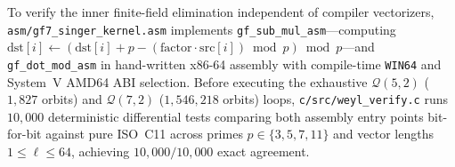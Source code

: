 \documentclass[11pt,letterpaper]{article}
\theoremstyle{plain}
\theoremstyle{definition}
\theoremstyle{remark}
\newcommand{\Qcode}{\mathcal{Q}}
\begin{document}
To verify the inner finite-field elimination independent of compiler vectorizers, \texttt{asm/\allowbreak gf7\_\allowbreak singer\_\allowbreak kernel.asm} implements \texttt{gf\_\allowbreak sub\_\allowbreak mul\_\allowbreak asm}---computing $\mathrm{dst}[i]\gets (\mathrm{dst}[i]+p-(\mathrm{factor}\cdot\mathrm{src}[i])\bmod p)\bmod p$---and \texttt{gf\_\allowbreak dot\_\allowbreak mod\_\allowbreak asm} in hand-written x86-64 assembly with compile-time \texttt{WIN64} and System~V AMD64 ABI selection. Before executing the exhaustive $\Qcode(5,2)$ ($1{,}827$ orbits) and $\Qcode(7,2)$ ($1{,}546{,}218$ orbits) loops, \texttt{c/src/weyl\_\allowbreak verify.c} runs $10{,}000$ deterministic differential tests comparing both assembly entry points bit-for-bit against pure ISO~C11 across primes $p\in\{3,5,7,11\}$ and vector lengths $1\le \ell\le 64$, achieving $10{,}000/10{,}000$ exact agreement.

{\raggedright


}
\end{document}
